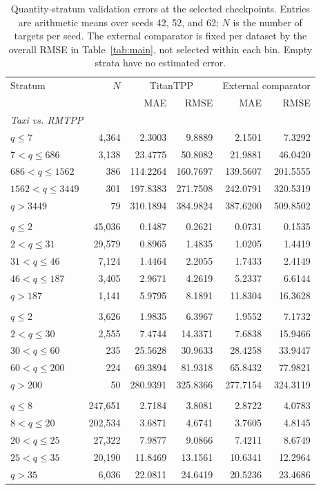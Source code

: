 \begin{table}[p]
\caption{Quantity-stratum validation errors at the selected checkpoints. Entries are arithmetic means over seeds 42, 52, and 62; $N$ is the number of targets per seed. The external comparator is fixed per dataset by the overall RMSE in Table~\ref{tab:main}, not selected within each bin. Empty strata have no estimated error.}
\label{tab:strata-quantity}\centering\scriptsize
\setlength{\tabcolsep}{4pt}
\begin{tabular}{lrrrrr}
\toprule
Stratum & $N$ & \multicolumn{2}{c}{TitanTPP} & \multicolumn{2}{c}{External comparator}\\
 & & MAE & RMSE & MAE & RMSE\\
\midrule
\multicolumn{6}{l}{\textit{Taxi vs. RMTPP}}\\
$q\le 7$ & 4,364 & 2.3003 & 9.8889 & 2.1501 & 7.3292\\
$7<q\le 686$ & 3,138 & 23.4775 & 50.8082 & 21.9881 & 46.0420\\
$686<q\le 1562$ & 386 & 114.2264 & 160.7697 & 139.5607 & 201.5555\\
$1562<q\le 3449$ & 301 & 197.8383 & 271.7508 & 242.0791 & 320.5319\\
$q> 3449$ & 79 & 310.1894 & 384.9824 & 387.6200 & 509.8502\\
\addlinespace
\multicolumn{6}{l}{\textit{Intermittent vs. RMTPP}}\\
$q\le 2$ & 45,036 & 0.1487 & 0.2621 & 0.0731 & 0.1535\\
$2<q\le 31$ & 29,579 & 0.8965 & 1.4835 & 1.0205 & 1.4419\\
$31<q\le 46$ & 7,124 & 1.4464 & 2.2055 & 1.7433 & 2.4149\\
$46<q\le 187$ & 3,405 & 2.9671 & 4.2619 & 5.2337 & 6.6144\\
$q> 187$ & 1,141 & 5.9795 & 8.1891 & 11.8304 & 16.3628\\
\addlinespace
\multicolumn{6}{l}{\textit{RAF vs. S2P2}}\\
$q\le 2$ & 3,626 & 1.9835 & 6.3967 & 1.9552 & 7.1732\\
$2<q\le 30$ & 2,555 & 7.4744 & 14.3371 & 7.6838 & 15.9466\\
$30<q\le 60$ & 235 & 25.5628 & 30.9633 & 28.4258 & 33.9447\\
$60<q\le 200$ & 224 & 69.3894 & 81.9318 & 65.8432 & 77.9821\\
$q> 200$ & 50 & 280.9391 & 325.8366 & 277.7154 & 324.3119\\
\addlinespace
\multicolumn{6}{l}{\textit{Instacart vs. S2P2}}\\
$q\le 8$ & 247,651 & 2.7184 & 3.8081 & 2.8722 & 4.0783\\
$8<q\le 20$ & 202,534 & 3.6871 & 4.6741 & 3.7605 & 4.8145\\
$20<q\le 25$ & 27,322 & 7.9877 & 9.0866 & 7.4211 & 8.6749\\
$25<q\le 35$ & 20,190 & 11.8469 & 13.1561 & 10.6341 & 12.2964\\
$q> 35$ & 6,036 & 22.0811 & 24.6419 & 20.5236 & 23.4686\\
\bottomrule
\end{tabular}
\end{table}


